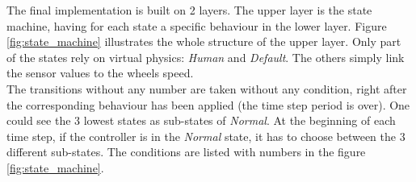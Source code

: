 \documentclass[oneside, a4paper, 12pt]{memoir}
\begin{document}
	The final implementation is built on 2 layers. The upper layer is the state machine, having for each state a specific behaviour in the lower layer. Figure \ref{fig:state_machine} illustrates the whole structure of the upper layer. Only part of the states rely on virtual physics: \emph{Human} and \emph{Default}. The others simply link the sensor values to the wheels speed.\\
	
	The transitions without any number are taken without any condition, right after the corresponding behaviour has been applied (the time step period is over). One could see the 3 lowest states as sub-states of \emph{Normal}. At the beginning of each time step, if the controller is in the \emph{Normal} state, it has to choose between the 3 different sub-states. The conditions are listed with numbers in the figure \ref{fig:state_machine}.
	
\end{document}
